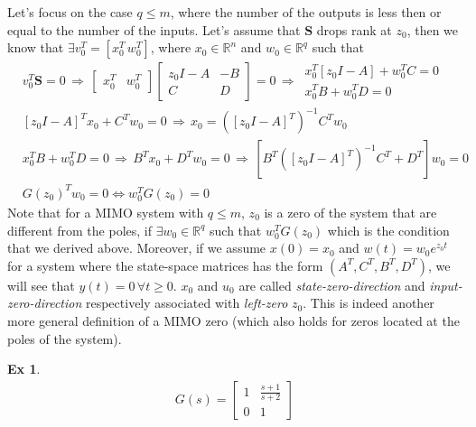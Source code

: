 \documentclass[twoside]{article}
\newtheorem{exmp}[theorem]{Ex}
\begin{document}
Let's focus on the case $q \leq m$, where the number of the outputs is less then or equal to the number of the inputs. 
Let's assume that  $\mathbf{S}$ drops rank at $z_0$, then we know that $\exists v_0^T = [x_0^T \, w_0^T]$, where $x_0 \in \mathbb{R}^{n}$ and $w_0 \in \mathbb{R}^q$ such that 
%
\begin{align*}
&v_0 ^T \mathbf{S} = 0
\, \Rightarrow \,
\left[ \begin{array}{cc} x_0^T & w_0^T \end{array} \right] \left[ \begin{array}{cc} z_0 I - A & -B \\ C & D \end{array} \right] = 0
\, \Rightarrow \,
 \begin{array}{cc} x_0^T \left[ z_0 I - A \right] + w_0^T C = 0 \\ x_0^T B + w_0^T D = 0 \end{array}
 \\
 &\left[ z_0 I - A \right]^T x_0 + C^T w_0 = 0 \, \Rightarrow \, x_0 =  \left( \left[ z_0 I - A \right]^T \right)^{-1} C^T w_0
\\
&x_0^T B + w_0^T D = 0 \, \Rightarrow \, B^T x_0 + D^T w_0 = 0  \, \Rightarrow \, 
\left[ B^T \left( \left[ z_0 I - A \right]^T \right)^{-1} C^T + D^T \right] w_0 = 0
\\
&G(z_0)^T w_0 =  0 \iff w_0^T G(z_0) = 0
\end{align*}
%
Note that for a MIMO system with $q \leq m$, $z_0$ is a zero of the system that are different from the poles, 
if $\exists w_0 \in \mathbb{R}^q$ such that $w_0^T G(z_0) $ which is the condition that we derived above. Moreover, if we 
assume $x(0) = x_0$ and $w(t) = w_0 e^{z_0 t}$ for a system where the state-space matrices has the form $(A^T,C^T,B^T,D^T)$, we will see that $y(t) = 0 \, \forall t \geq 0$. $x_0$ and $u_0$ are called 
\textit{state-zero-direction} and \textit{input-zero-direction} respectively associated with \textit{left-zero} $z_0$. This is indeed another more general definition of a MIMO zero (which also holds for zeros located at the poles of the system).

\begin{exmp}
	\begin{align*}
	G(s) = \left[ \begin{array}{ccc} 1 & \frac{s+1}{s+2}  \\  
	0 & 1  \end{array} \right]
	\end{align*}
\end{exmp}
\end{document}
